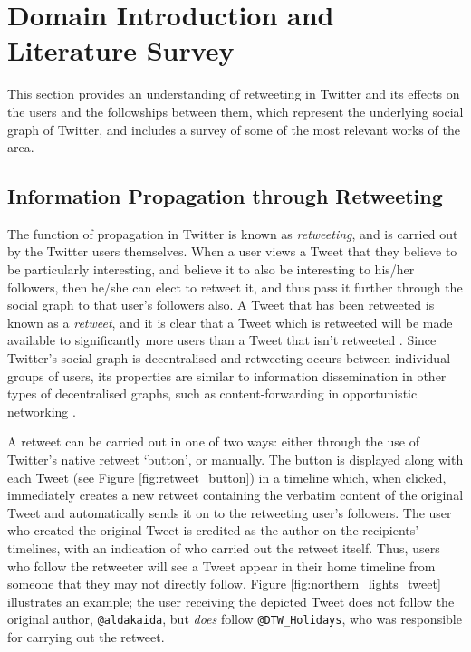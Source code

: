 \section{Domain Introduction and Literature Survey}
This section provides an understanding of retweeting in Twitter and its effects on the users and the followships between them, which represent the underlying social graph of Twitter, and includes a survey of some of the most relevant works of the area.

\subsection{Information Propagation through Retweeting}
The function of propagation in Twitter is known as \textit{retweeting}, and is carried out by the Twitter users themselves. When a user views a Tweet that they believe to be particularly interesting, and believe it to also be interesting to his/her followers, then he/she can elect to retweet it, and thus pass it further through the social graph to that user's followers also. A Tweet that has been retweeted is known as a \textit{retweet}, and it is clear that a Tweet which is retweeted will be made available to significantly more users than a Tweet that isn't retweeted \cite{webberley11, kwak10}. Since Twitter's social graph is decentralised and retweeting occurs between individual groups of users, its properties are similar to information dissemination in other types of decentralised graphs, such as content-forwarding in opportunistic networking \cite{allen10}.

A retweet can be carried out in one of two ways: either through the use of Twitter's native retweet `button', or manually. The button is displayed along with each Tweet (see Figure \ref{fig:retweet_button}) in a timeline which, when clicked, immediately creates a new retweet containing the verbatim content of the original Tweet and automatically sends it on to the retweeting user's followers. The user who created the original Tweet is credited as the author on the recipients' timelines, with an indication of who carried out the retweet itself. Thus, users who follow the retweeter will see a Tweet appear in their home timeline from someone that they may not directly follow. Figure \ref{fig:northern_lights_tweet} illustrates an example; the user receiving the depicted Tweet does not follow the original author, \texttt{@aldakaida}, but \textit{does} follow \texttt{@DTW\_Holidays}, who was responsible for carrying out the retweet. 


